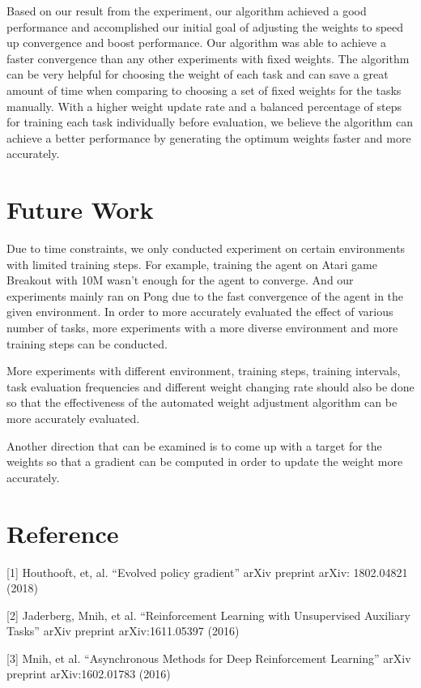 \documentclass[12pt,twocolumn,letterpaper]{article}
\begin{document}
Based on our result from the experiment, our algorithm achieved a good performance and accomplished our initial goal of adjusting the weights to speed up convergence and boost performance. Our algorithm was able to achieve a faster convergence than any other experiments with fixed weights. The algorithm can be very helpful for choosing the weight of each task and can save a great amount of time when comparing to choosing a set of fixed weights for the tasks manually. With a higher weight update rate and a balanced percentage of steps for training each task individually before evaluation, we believe the algorithm can achieve a better performance by generating the optimum weights faster and more accurately.


\section{Future Work}
Due to time constraints, we only conducted experiment on certain environments with limited training steps. For example, training the agent on Atari game Breakout with 10M wasn’t enough for the agent to converge. And our experiments mainly ran on Pong due to the fast convergence of the agent in the given environment. In order to more accurately evaluated the effect of various number of tasks, more experiments with a more diverse environment and more training steps can be conducted.

More experiments with different environment, training steps, training intervals, task evaluation frequencies and different weight changing rate should also be done so that the effectiveness of the automated weight adjustment algorithm can be more accurately evaluated.

Another direction that can be examined is to come up with a target for the weights so that a gradient can be computed in order to update the weight more accurately.


\section{Reference}
[1] Houthooft, et, al. “Evolved policy gradient” arXiv preprint arXiv: 1802.04821 (2018)

[2] Jaderberg, Mnih, et al. “Reinforcement Learning with Unsupervised Auxiliary Tasks” arXiv preprint arXiv:1611.05397 (2016)

[3]  Mnih, et al. “Asynchronous Methods for Deep Reinforcement Learning” arXiv preprint arXiv:1602.01783 (2016)
\end{document}
